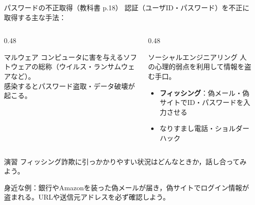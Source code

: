 \documentclass[aspectratio=43,professionalfonts,handout,10pt]{beamer}
\begin{document}

\begin{frame}{パスワードの不正取得（教科書 p.18）}
  {\small 認証（ユーザID・パスワード）を不正に取得する主な手法：}

  \begin{columns}[T]
    \begin{column}{0.48\textwidth}
      \begin{exampleblock}{マルウェア}
        \small
        コンピュータに害を与えるソフトウェアの総称（ウイルス・ランサムウェアなど）。\\
        感染するとパスワード盗取・データ破壊が起こる。
      \end{exampleblock}
    \end{column}
    \begin{column}{0.48\textwidth}
      \begin{exampleblock}{ソーシャルエンジニアリング}
        \small
        人の心理的弱点を利用して情報を盗む手口。
        \begin{itemize}
          \item \textbf{フィッシング}：偽メール・偽サイトでID・パスワードを入力させる
          \item なりすまし電話・ショルダーハック
        \end{itemize}
      \end{exampleblock}
    \end{column}
  \end{columns}

  \begin{exampleblock}{演習}
    フィッシング詐欺に引っかかりやすい状況はどんなときか，話し合ってみよう。
  \end{exampleblock}

  \begin{slidenote}
    身近な例：銀行やAmazonを装った偽メールが届き，偽サイトでログイン情報が盗まれる。URLや送信元アドレスを必ず確認しよう。
  \end{slidenote}
\end{frame}

\end{document}
